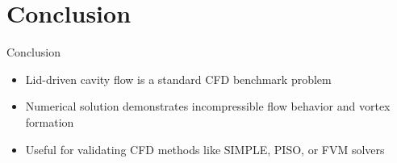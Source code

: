 \documentclass{beamer}
\begin{document}
\section{Conclusion}
\begin{frame}{Conclusion}
\begin{itemize}
    \item Lid-driven cavity flow is a standard CFD benchmark problem
    \item Numerical solution demonstrates incompressible flow behavior and vortex formation
    \item Useful for validating CFD methods like SIMPLE, PISO, or FVM solvers
\end{itemize}
\end{frame}
\end{document}

